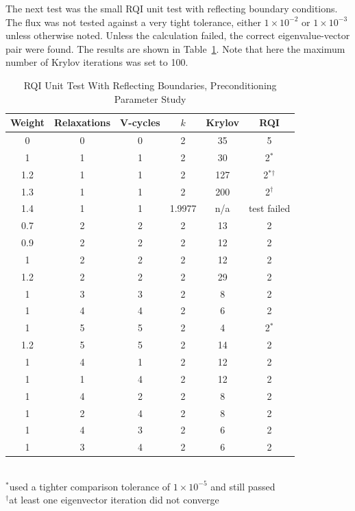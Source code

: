 The next test was the small RQI unit test with reflecting boundary conditions. The flux was not tested against a very tight tolerance, either $1 \times 10^{-2}$ or $1 \times 10^{-3}$ unless otherwise noted. Unless the calculation failed, the correct eigenvalue-vector pair were found. The results are shown in Table~\ref{table:RQIUnitTestRefl}. Note that here the maximum number of Krylov iterations was set to 100.
%
\begin{table}[!h]
\caption{RQI Unit Test With Reflecting Boundaries, Preconditioning Parameter Study}
\begin{center}
\begin{tabular}{c c c c c c}
\hline
Weight & Relaxations & V-cycles & $k$ & Krylov & RQI \\[0.5ex]
\hline
0    & 0 & 0 & 2 & 35   & 5 \\
1    & 1 & 1 & 2 & 30   & 2$^{*}$ \\
1.2 & 1 & 1 & 2 & 127 & 2$^{*}$$^{\dagger}$ \\
1.3 & 1 & 1 & 2 & 200 & 2$^{\dagger}$ \\
1.4 & 1 & 1 & 1.9977  & n/a & test failed \\
\hline
0.7 & 2 & 2 & 2 & 13   & 2 \\
0.9 & 2 & 2 & 2 & 12   & 2 \\
1    & 2 & 2 & 2 & 12   & 2 \\
1.2 & 2 & 2 & 2 & 29   & 2 \\
\hline
1    & 3 & 3 & 2 & 8     & 2 \\
1    & 4 & 4 & 2 & 6     & 2 \\
1    & 5 & 5 & 2 & 4     & 2$^{*}$ \\
1.2 & 5 & 5 & 2 & 14   & 2 \\
\hline
1    & 4 & 1 & 2 & 12   & 2 \\
1    & 1 & 4 & 2 & 12   & 2 \\
1    & 4 & 2 & 2 & 8     & 2 \\
1    & 2 & 4 & 2 & 8     & 2 \\
1    & 4 & 3 & 2 & 6     & 2 \\
1    & 3 & 4 & 2 & 6     & 2 \\
\hline 
\end{tabular}\\
$^{*}$used a tighter comparison tolerance of $1 \times 10^{-5}$ and still passed\\
$^{\dagger}$at least one eigenvector iteration did not converge
\end{center}
\label{table:RQIUnitTestRefl}
\end{table}

